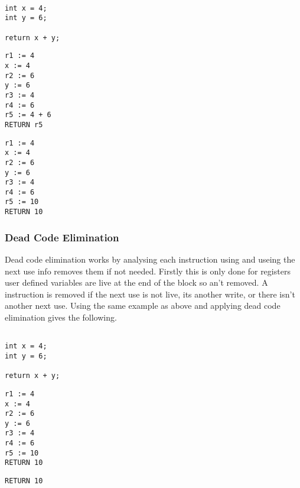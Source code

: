 \documentclass{article}
\begin{document}
\begin{minipage}{0.3\textwidth}
\begin{lstlisting}

int x = 4;
int y = 6;

return x + y;

\end{lstlisting}
\end{minipage}%
\begin{minipage}{0.3\textwidth}
\begin{lstlisting}
r1 := 4
x := 4
r2 := 6
y := 6
r3 := 4
r4 := 6
r5 := 4 + 6
RETURN r5

\end{lstlisting}
\end{minipage}%
\begin{minipage}{0.3\textwidth}
\begin{lstlisting}
r1 := 4
x := 4
r2 := 6
y := 6
r3 := 4
r4 := 6
r5 := 10
RETURN 10
\end{lstlisting}
\end{minipage}%

\subsubsection{Dead Code Elimination}

Dead code elimination works by analysing each instruction using and useing the
next use info removes them if not needed. Firstly this is only done for registers
user defined variables are live at the end of the block so an't removed. A instruction
is removed if the next use is not live, its another write, or there isn't another
next use. Using the same example as above and applying dead code elimination gives
the following.

\begin{minipage}{0.3\textwidth}
\begin{lstlisting}

int x = 4;
int y = 6;

return x + y;

\end{lstlisting}
\end{minipage}%
\begin{minipage}{0.3\textwidth}
\begin{lstlisting}
r1 := 4
x := 4
r2 := 6
y := 6
r3 := 4
r4 := 6
r5 := 10
RETURN 10

\end{lstlisting}
\end{minipage}%
\begin{minipage}{0.3\textwidth}
\begin{lstlisting}
RETURN 10
\end{lstlisting}
\end{minipage}%
\end{document}

